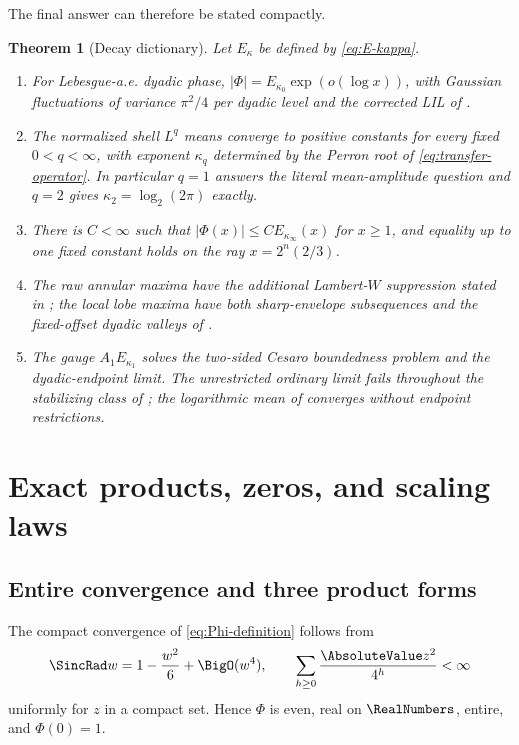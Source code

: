 \documentclass[11pt,oneside]{article}
\newtheorem{theorem}{Theorem}[section]
\theoremstyle{definition}
\theoremstyle{remark}
\newcommand{\Phiup}{\Phi}
\begin{document}
The final answer can therefore be stated compactly.

\begin{theorem}[Decay dictionary]
\label{thm:decay-dictionary}
Let $E_\kappa$ be defined by \eqref{eq:E-kappa}.
\begin{enumerate}
\item For Lebesgue-a.e. dyadic phase, $|\Phi|=E_{\kappa_0}\exp(o(\log x))$,
with Gaussian fluctuations of variance $\pi^2/4$ per dyadic level and the corrected LIL of
.
\item The normalized shell $L^q$ means converge to positive constants for every fixed
$0<q<\infty$, with exponent $\kappa_q$ determined by the Perron root of
\eqref{eq:transfer-operator}.  In particular $q=1$ answers the literal mean-amplitude
question and $q=2$ gives $\kappa_2=\log_2(2\pi)$ exactly.
\item There is $C<\infty$ such that $|\Phi(x)|\le C E_{\kappa_\infty}(x)$ for $x\ge1$,
and equality up to one fixed constant holds on the ray $x=2^n(2/3)$.
\item The raw annular maxima have the additional Lambert-$W$ suppression stated in
; the local lobe maxima have both sharp-envelope subsequences and the
fixed-offset dyadic valleys of .
\item The gauge $A_1E_{\kappa_1}$ solves the two-sided Cesaro boundedness problem and the
dyadic-endpoint limit.  The unrestricted ordinary limit fails throughout the stabilizing
class of ; the logarithmic mean of
 converges without endpoint restrictions.
\end{enumerate}
\end{theorem}

\section{Exact products, zeros, and scaling laws}
\label{sec:exact-products}

\subsection{Entire convergence and three product forms}

The compact convergence of \eqref{eq:Phi-definition} follows from
\[
 \SincRad w=1-\frac{w^2}{6}+\BigO(w^4),
 \qquad
 \sum_{h\ge0}\frac{\AbsoluteValue z^2}{4^h}<\infty
\]
uniformly for $z$ in a compact set.  Hence $\Phiup$ is even, real on $\RealNumbers$, entire, and
$\Phiup(0)=1$.
\end{document}
